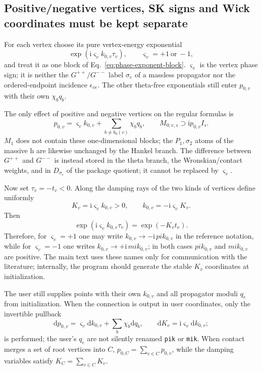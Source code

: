 \documentclass[11pt,a4paper]{article}
\newcommand{\dd}{\mathrm d}
\newcommand{\ii}{\mathrm i}
\begin{document}
\subsection{Positive/negative vertices, SK signs and Wick coordinates must be kept separate}

For each vertex choose its pure vertex-energy exponential
\begin{equation}
 \exp(\ii\varsigma_vk_{0,v}\tau_v),
 \qquad \varsigma_v=+1\ \text{or}\ -1,
 \label{eq:vertex-phase-sign}
\end{equation}
and treat it as one block of Eq.~\eqref{eq:phase-exponent-block}. $\varsigma_v$ is the vertex phase sign; it is neither the $G^{++}/G^{--}$ label $\sigma_e$ of a massless propagator nor the ordered-endpoint incidence $\epsilon_{ve}$. The other theta-free exponentials still enter $p_{0,v}$ with their own $\chi_bq_b$.

The only effect of positive and negative vertices on the regular formulas is
\begin{equation}
 p_{0,v}=\varsigma_vk_{0,v}+\sum_{b\neq b_0(v)}\chi_bq_b,
 \qquad
 M_{0;v,s}\supset\ii p_{0,v}I_s.
 \label{eq:signed-vertex-M0}
\end{equation}
$M_1$ does not contain these one-dimensional blocks; the $P_1,\sigma_2$ atoms of the massive h are likewise unchanged by the Hankel branch. The difference between $G^{++}$ and $G^{--}$ is instead stored in the theta branch, the Wronskian/contact weights, and in $D_{\sigma_e}$ of the package quotient; it cannot be replaced by $\varsigma_v$.

Now set $\tau_v=-t_v<0$. Along the damping rays of the two kinds of vertices define uniformly
\begin{equation}
 K_v=\ii\varsigma_vk_{0,v}>0,
 \qquad
 k_{0,v}=-\ii\varsigma_vK_v.
 \label{eq:unified-vertex-wick-coordinate}
\end{equation}
Then
\begin{equation}
 \exp(\ii\varsigma_vk_{0,v}\tau_v)=\exp(-K_vt_v).
\end{equation}
Therefore, for $\varsigma_v=+1$ one may write $k_{0,v}\to-\ii\,pik_{0,v}$ in the reference notation, while for $\varsigma_v=-1$ one writes $k_{0,v}\to+\ii\,mik_{0,v}$; in both cases $pik_{0,v}$ and $mik_{0,v}$ are positive. The main text uses these names only for communication with the literature; internally, the program should generate the stable $K_v$ coordinates at initialization.

The user still supplies points with their own $k_{0,v}$ and all propagator moduli $q_e$ from initialization. When the connection is output in user coordinates, only the invertible pullback
\begin{equation}
 \dd p_{0,v}=\varsigma_v\dd k_{0,v}+\sum_b\chi_b\dd q_b,
 \qquad
 \dd K_v=\ii\varsigma_v\dd k_{0,v};
 \label{eq:user-to-internal-coordinate-pullback}
\end{equation}
is performed; the user's $q_e$ are not silently renamed \texttt{pik} or \texttt{mik}. When contact merges a set of root vertices into $C$, $p_{0,C}=\sum_{v\in C}p_{0,v}$, while the damping variables satisfy $K_C=\sum_{v\in C}K_v$.
\end{document}

